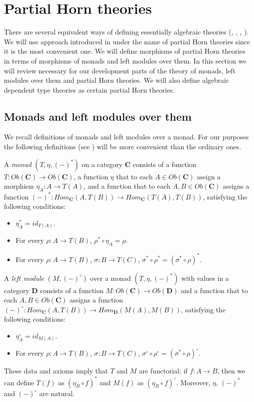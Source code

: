 \documentclass{elsarticle}
\theoremstyle{definition}
\theoremstyle{remark}
\newcommand{\cat}[1]{\mathbf{#1}}
\newcommand{\C}{\cat{C}}
\newcommand{\D}{\cat{D}}
\numberwithin{figure}{section}
\begin{document}
\section{Partial Horn theories}
\label{sec:PHT}

There are several equivalent ways of defining essentially algebraic theories (\cite{LPC}, \cite{GAT}, \cite{PHL}, \cite[D 1.3.4]{elephant}).
We will use approach introduced in \cite{PHL} under the name of partial Horn theories since it is the most convenient one.
We will define morphisms of partial Horn theories in terms of morphisms of monads and left modules over them.
In this section we will review necessary for our development parts of the theory of monads, left modules over them and partial Horn theories.
We will also define algebraic dependent type theories as certain partial Horn theories.

\subsection{Monads and left modules over them}

We recall definitions of monads and left modules over a monad.
For our purposes the following definitions (see \cite{manes-algebraic-theories}) will be more convenient than the ordinary ones.
\begin{defn}
A \emph{monad} $(T,\eta,(-)^*)$ on a category $\C$ consists of a function $T : Ob(\C) \to Ob(\C)$,
a function $\eta$ that to each $A \in Ob(\C)$ assign a morphism $\eta_A : A \to T(A)$,
and a function that to each $A,B \in Ob(\C)$ assigns a function $(-)^* : Hom_\C(A,T(B)) \to Hom_\C(T(A),T(B))$, satisfying the following conditions:
\begin{itemize}
\item $\eta_A^* = id_{T(A)}$.
\item For every $\rho : A \to T(B)$, $\rho^* \circ \eta_A = \rho$.
\item For every $\rho : A \to T(B)$, $\sigma : B \to T(C)$, $\sigma^* \circ \rho^* = (\sigma^* \circ \rho)^*$.
\end{itemize}

A \emph{left module} $(M,(-)^\circ)$ over a monad $(T,\eta,(-)^*)$ with values in a category $\D$ consists of a function $M : Ob(\C) \to Ob(\D)$
and a function that to each $A,B \in Ob(\C)$ assigns a function $(-)^\circ : Hom_\C(A,T(B)) \to Hom_\D(M(A),M(B))$, satisfying the following conditions:
\begin{itemize}
\item $\eta_A^\circ = id_{M(A)}$.
\item For every $\rho : A \to T(B)$, $\sigma : B \to T(C)$, $\sigma^\circ \circ \rho^\circ = (\sigma^* \circ \rho)^\circ$.
\end{itemize}
\end{defn}
These data and axioms imply that $T$ and $M$ are functorial: if $f : A \to B$, then we can define $T(f)$ as $(\eta_B \circ f)^*$ and $M(f)$ as $(\eta_B \circ f)^\circ$.
Moreover, $\eta$, $(-)^*$ and $(-)^\circ$ are natural.
\end{document}
